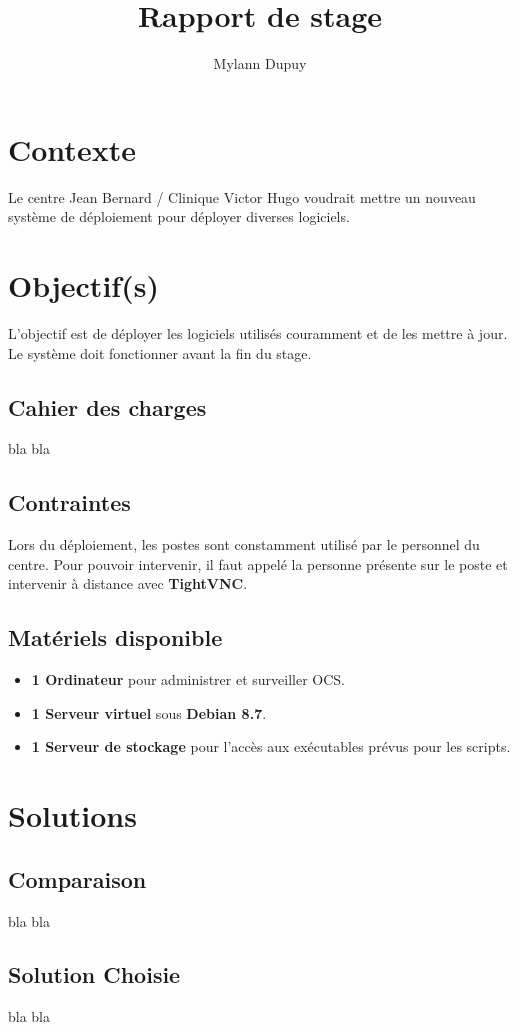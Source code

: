 \documentclass[11pt,a4paper,oneside]{article}
\author{Mylann Dupuy}
\title{Rapport de stage}
\begin{document}
\maketitle
\newpage
\tableofcontents
\newpage
\section{Contexte}
Le centre Jean Bernard / Clinique Victor Hugo voudrait mettre un nouveau système de déploiement pour déployer diverses logiciels.
\section{Objectif(s)}
L'objectif est de déployer les logiciels utilisés couramment et de les mettre à jour. Le système doit fonctionner avant la fin du stage. 
\subsection{Cahier des charges}
bla bla
\\
\subsection{Contraintes}
Lors du déploiement, les postes sont constamment utilisé par le personnel du centre. Pour pouvoir intervenir, il faut appelé la personne présente sur le poste et intervenir à distance avec \textbf{TightVNC}.
\subsection{Matériels disponible}
\begin{itemize}
	\item \textbf{1 Ordinateur} pour administrer et surveiller OCS.
	\item \textbf{1 Serveur virtuel} sous 	\textbf{Debian 8.7}.
	\item \textbf{1 Serveur de stockage}  pour l'accès aux exécutables prévus pour les scripts. 

\end{itemize}
\section{Solutions}
\subsection{Comparaison}
bla bla
\\
\subsection{Solution Choisie}
bla bla
\\
\end{document}
